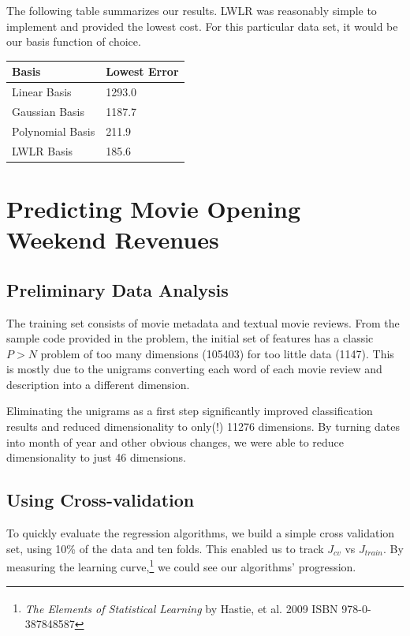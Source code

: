 \documentclass[11pt, oneside]{article}   	%
\begin{document}
The following table summarizes our results. LWLR was reasonably simple to implement and provided the lowest cost. For this particular data set, it would be our basis function of choice.

\begin{center}
    \begin{tabular}{| l | l |}
    \hline
    Basis & Lowest Error \\ \hline
    Linear Basis & \hfill 1293.0 \\
    Gaussian Basis & \hfill 1187.7 \\
    Polynomial Basis & \hfill 211.9 \\
    LWLR Basis & \hfill 185.6 \\
    \hline
    \end{tabular}
\end{center}


\section*{Predicting Movie Opening Weekend Revenues}


\subsection*{Preliminary Data Analysis}

The training set consists of movie metadata and textual movie reviews. From the sample code provided in the problem, the initial set of features has a classic $P > N$ problem of too many dimensions (105403) for too little data (1147).  This is mostly due to the unigrams converting each word of each movie review and description into a different dimension.

Eliminating the unigrams as a first step significantly improved classification results and reduced dimensionality to only(!) 11276 dimensions. By turning dates into month of year and other obvious changes, we were able to reduce dimensionality to just 46 dimensions.

\subsection*{Using Cross-validation}

To quickly evaluate the regression algorithms, we build a simple cross validation set, using 10\% of the data and ten folds. This enabled us to track $J_{cv}$ vs $J_{train}$. By measuring the learning curve,\footnote{\emph{The Elements of Statistical Learning} by Hastie, et al. \textsuperscript{\textcopyright} 2009 ISBN 978-0-387848587} we could see our algorithms' progression.
\end{document}
